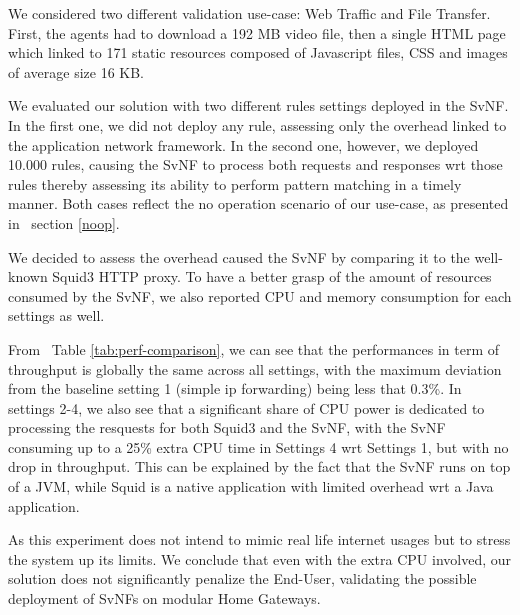 We considered two different validation use-case: Web Traffic and File Transfer. First, the agents had to download a 192 MB video file, then a single HTML page which linked to 171 static resources composed of Javascript files, CSS and images of average size 16 KB.

We evaluated our solution with two different rules settings deployed in the SvNF. In the first one, we did not deploy any rule, assessing only the overhead linked to the application network framework. In the second one, however, we deployed 10.000 rules, causing the SvNF to process both requests and responses wrt those rules thereby assessing its ability to perform pattern matching in a timely manner. Both cases reflect the no operation scenario of our use-case, as  presented in ~section \ref{noop}.

We decided to assess the overhead caused the SvNF by comparing it to the well-known Squid3 HTTP proxy. To have a better grasp of the amount of resources consumed by the SvNF, we also reported CPU and memory consumption for each settings as well.

From ~Table \ref{tab:perf-comparison}, we can see that the performances in term of throughput is globally the same across all settings, with the maximum deviation from the baseline setting 1 (simple ip forwarding) being less that 0.3\%.
In settings 2-4, we also see that a significant share of CPU power is dedicated to processing the resquests for both Squid3 and the SvNF, with the SvNF consuming up to a 25\% extra CPU time in Settings 4 wrt Settings 1, but with no drop in throughput. This can be explained by the fact that the SvNF runs on top of a JVM, while Squid is a native application with limited overhead wrt a Java application.

As this experiment does not intend to mimic real life internet usages but to stress the system up its limits.
We conclude that even with the extra CPU involved, our solution does not significantly penalize the End-User, validating the possible deployment of SvNFs on modular Home Gateways.

